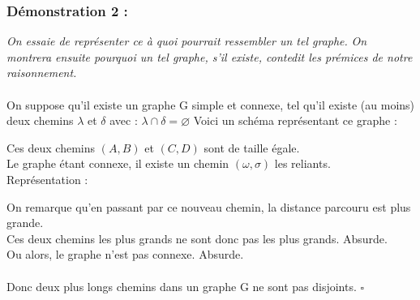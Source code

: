 \documentclass{article}
\begin{document}
        \subsubsection*{Démonstration 2 :}
            \textit{On essaie de représenter ce à quoi pourrait ressembler un tel graphe.}
            \textit{On montrera ensuite pourquoi un tel graphe, s'il existe, contedit les prémices de notre raisonnement.}\\\\
            \textrm{On suppose qu'il existe un graphe G simple et connexe, tel qu'il existe (au moins) deux chemins $\lambda$ et $\delta$ avec :}
            $
            \lambda \cap \delta = \varnothing
            $
            \textrm{Voici un schéma représentant ce graphe :}
            \begin{center}
            \end{center}
            \textrm{Ces deux chemins $(A,B)$ et $(C,D)$ sont de taille égale.}\\
            \textrm{Le graphe étant connexe, il existe un chemin $(\omega,\sigma)$ les reliants.}\\
            \textrm{Représentation :}
            \begin{center}
            \end{center}
            \textrm{On remarque qu'en passant par ce nouveau chemin, la distance parcouru est plus grande.}\\
            \textrm{Ces deux chemins les plus grands ne sont donc pas les plus grands. Absurde.}\\
            \textrm{Ou alors, le graphe n'est pas connexe. Absurde.}\\\\
            \textrm{Donc deux plus longs chemins dans un graphe G ne sont pas disjoints.}
            $\square $
\end{document}

